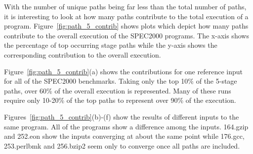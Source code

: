 With the number of unique paths being far less than the total number
of paths, it is interesting to look at how many paths contribute to the
total execution of a program. Figure~\ref{fig:path_5_contrib} shows
plots which depict how many paths contribute to the overall execution
of the SPEC2000 programs. The x-axis shows the percentage of top
occurring stage paths while the y-axis shows the corresponding contribution to the
overall execution.

Figure~\ref{fig:path_5_contrib}(a) shows the contributions for one
reference input for all of the SPEC2000 benchmarks. Taking only the
top 10\% of the 5-stage paths, over 60\% of the overall execution is
represented. Many of these runs require only 10-20\% of the top paths
to represent over 90\% of the execution.

Figures~\ref{fig:path_5_contrib}(b)-(f) show the results of different
inputs to the same program. All of the programs show a difference
among the inputs.  164.gzip and 252.eon show the inputs converging at
about the same point while 176.gcc, 253.perlbmk and 256.bzip2 seem
only to converge once all paths are included.

